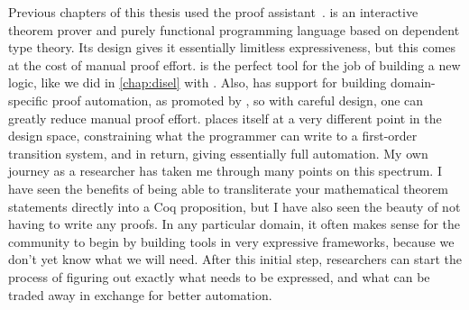 Previous chapters of this thesis used the \Coq proof assistant~\cite{Coq}.
%
\Coq is an interactive theorem prover and purely functional programming language
based on dependent type theory.
%
Its design gives it essentially limitless expressiveness,
but this comes at the cost of manual proof effort.
%
\Coq is the perfect tool for the job of building a new logic,
like we did in \cref{chap:disel} with \disel.
%
Also, \Coq has support for building domain-specific proof automation,
as promoted by \citet{chlipala:cpdt},
so with careful design, one can greatly reduce manual proof effort.
%
\mypyvy places itself at a very different point in the design space,
constraining what the programmer can write to a first-order transition system,
and in return, giving essentially full automation.
%
%
My own journey as a researcher has taken me through many points
on this spectrum.
%
I have seen the benefits of being able to transliterate
your mathematical theorem statements directly into a Coq proposition,
but I have also seen the beauty of not having to write any proofs.
%
In any particular domain, it often makes sense for the community to
begin by building tools in very expressive frameworks,
because we don't yet know what we will need.
%
After this initial step, researchers can start the process of
figuring out exactly what needs to be expressed,
and what can be traded away in exchange for better automation.

